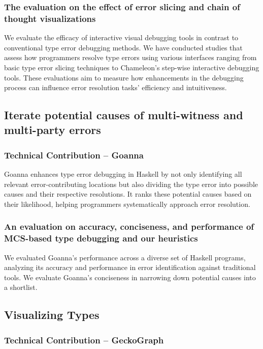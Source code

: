 \subsubsection{The evaluation on the effect of error slicing and chain of thought visualizations}
We evaluate the efficacy of interactive visual debugging tools in contrast to conventional type error debugging methods. We have conducted studies that assess how programmers resolve type errors using various interfaces ranging from basic type error slicing techniques to Chameleon's step-wise interactive debugging tools. These evaluations aim to measure how enhancements in the debugging process can influence error resolution tasks' efficiency and intuitiveness.

\subsection{Iterate potential causes of multi-witness and multi-party errors}

\subsubsection{Technical Contribution -- Goanna}
Goanna enhances type error debugging in Haskell by not only identifying all relevant error-contributing locations but also dividing the type error into possible causes and their respective resolutions. It ranks these potential causes based on their likelihood, helping programmers systematically approach error resolution.

\subsubsection{An evaluation on accuracy, conciseness, and performance of MCS-based type debugging and our heuristics}
We evaluated Goanna's performance across a diverse set of Haskell programs, analyzing its accuracy and performance in error identification against traditional tools. We evaluate Goanna's conciseness in narrowing down potential causes into a shortlist. 


\subsection{Visualizing Types}

\subsubsection{Technical Contribution -- GeckoGraph}


